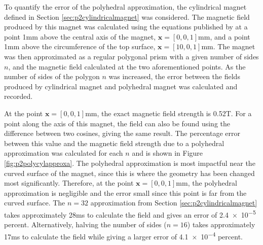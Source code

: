 To quantify the error of the polyhedral approximation, the cylindrical magnet defined in Section \ref{sec:p2cylindricalmagnet} was considered. The magnetic field produced by this magnet was calculated using the equations published by \textcite{Caciagli2018} at a point 1\si{\milli\metre} above the central axis of the magnet, \(\mathbf{x} = \left[ 0, 0, 1\right]\)\si{\milli\metre}, and a point 1\si{\milli\metre} above the circumference of the top surface, \(\mathbf{x} = \left[ 10, 0, 1 \right]\)\si{\milli\metre}. The magnet was then approximated as a regular polygonal prism with a given number of sides \(n\), and the magnetic field calculated at the two aforementioned points. As the number of sides of the polygon \(n\) was increased, the error between the fields produced by cylindrical magnet and polyhedral magnet was calculated and recorded.

At the point \(\mathbf{x} = \left[ 0,0,1\right]\)\si{\milli\metre}, the exact magnetic field strength \cite{Caciagli2018} is 0.52\si{\tesla}. For a point along the axis of this magnet, the field can also be found using the difference between two cosines, giving the same result. The percentage error between this value and the magnetic field strength due to a polyhedral approximation was calculated for each \(n\) and is shown in Figure \ref{fig:p2polycylapproxa}. The polyhedral approximation is most impactful near the curved surface of the magnet, since this is where the geometry has been changed most significantly. Therefore, at the point \(\mathbf{x} = \left[ 0,0,1\right]\)\si{\milli\metre}, the polyhedral approximation is negligible and the error small since this point is far from the curved surface. The \(n = 32\) approximation from Section \ref{sec:p2cylindricalmagnet} takes approximately 28\si{\milli\second} to calculate the field and gives an error of \num{2.4e-5} percent. Alternatively, halving the number of sides (\(n = 16\)) takes approximately 17\si{\milli\second} to calculate the field while giving a larger error of \num{4.1e-4} percent.

